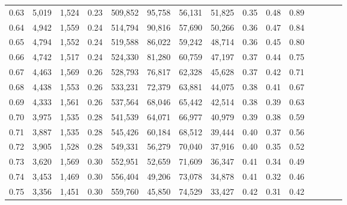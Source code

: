 \begin{tabular}{rrrcrrrrrrrrrrr}
0.63 &   5,019 &  1,524 &                                       0.23 &  509,852 &   95,758 &   56,131 &   51,825 &  0.35 &  0.48 &                         0.89 \\
0.64 &   4,942 &  1,559 &                                       0.24 &  514,794 &   90,816 &   57,690 &   50,266 &  0.36 &  0.47 &                         0.84 \\
0.65 &   4,794 &  1,552 &                                       0.24 &  519,588 &   86,022 &   59,242 &   48,714 &  0.36 &  0.45 &                         0.80 \\
0.66 &   4,742 &  1,517 &                                       0.24 &  524,330 &   81,280 &   60,759 &   47,197 &  0.37 &  0.44 &                         0.75 \\
0.67 &   4,463 &  1,569 &                                       0.26 &  528,793 &   76,817 &   62,328 &   45,628 &  0.37 &  0.42 &                         0.71 \\
0.68 &   4,438 &  1,553 &                                       0.26 &  533,231 &   72,379 &   63,881 &   44,075 &  0.38 &  0.41 &                         0.67 \\
0.69 &   4,333 &  1,561 &                                       0.26 &  537,564 &   68,046 &   65,442 &   42,514 &  0.38 &  0.39 &                         0.63 \\
0.70 &   3,975 &  1,535 &                                       0.28 &  541,539 &   64,071 &   66,977 &   40,979 &  0.39 &  0.38 &                         0.59 \\
0.71 &   3,887 &  1,535 &                                       0.28 &  545,426 &   60,184 &   68,512 &   39,444 &  0.40 &  0.37 &                         0.56 \\
0.72 &   3,905 &  1,528 &                                       0.28 &  549,331 &   56,279 &   70,040 &   37,916 &  0.40 &  0.35 &                         0.52 \\
0.73 &   3,620 &  1,569 &                                       0.30 &  552,951 &   52,659 &   71,609 &   36,347 &  0.41 &  0.34 &                         0.49 \\
0.74 &   3,453 &  1,469 &                                       0.30 &  556,404 &   49,206 &   73,078 &   34,878 &  0.41 &  0.32 &                         0.46 \\
0.75 &   3,356 &  1,451 &                                       0.30 &  559,760 &   45,850 &   74,529 &   33,427 &  0.42 &  0.31 &                         0.42 \\

\end{tabular}
